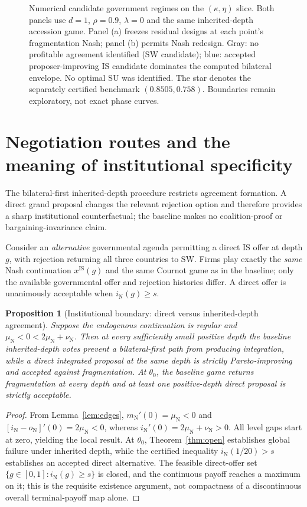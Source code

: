 \documentclass[11pt,a4paper]{article}
\newtheorem{proposition}[theorem]{Proposition}
\theoremstyle{remark}\newtheorem{remark}[theorem]{Remark}
\newcommand{\SW}{\mathrm{SW}}\newcommand{\SU}{\mathrm{SU}}\newcommand{\IS}{\mathrm{IS}}
\newcommand{\N}{\mathrm{N}}\newcommand{\F}{\mathrm{F}}
\begin{document}
\begin{figure}[H]
\centering
\resizebox{0.98\linewidth}{!}{}
\caption{Numerical candidate government regimes on the $(\kappa,\eta)$ slice. Both panels use $d=1$, $\rho=0.9$, $\lambda=0$ and the same inherited-depth accession game. Panel (a) freezes residual designs at each point's fragmentation Nash; panel (b) permits Nash redesign. Gray: no profitable agreement identified (SW candidate); blue: accepted proposer-improving IS candidate dominates the computed bilateral envelope. No optimal SU was identified. The star denotes the separately certified benchmark $(0.8505,0.758)$. Boundaries remain exploratory, not exact phase curves.}
\label{fig:phase}
\end{figure}

\section{Negotiation routes and the meaning of institutional specificity}\label{sec:institution}
The bilateral-first inherited-depth procedure restricts agreement formation. A direct grand proposal changes the relevant rejection option and therefore provides a sharp institutional counterfactual; the baseline makes no coalition-proof or bargaining-invariance claim.

Consider an \emph{alternative} governmental agenda permitting a direct $\IS$ offer at depth $g$, with rejection returning all three countries to $\SW$. Firms play exactly the \emph{same} Nash continuation $x^{\IS}(g)$ and the same Cournot game as in the baseline; only the available governmental offer and rejection histories differ. A direct offer is unanimously acceptable when $i_{\N}(g)\ge s$.

\begin{proposition}[Institutional boundary: direct versus inherited-depth agreement]\label{prop:direct}
Suppose the endogenous continuation is regular and $\mu_{\N}<0<2\mu_{\N}+\nu_{\N}$. Then at every sufficiently small positive depth the baseline inherited-depth votes prevent a bilateral-first path from producing integration, while a \emph{direct} integrated proposal at the same depth is strictly Pareto-improving and accepted against fragmentation. At $\theta_0$, the baseline game returns fragmentation at every depth and at least one positive-depth direct proposal is strictly acceptable.
\end{proposition}
\begin{proof}
From Lemma~\ref{lem:edges}, $m_{\N}'(0)=\mu_{\N}<0$ and $[i_{\N}-o_{\N}]'(0)=2\mu_{\N}<0$, whereas $i_{\N}'(0)=2\mu_{\N}+\nu_{\N}>0$. All level gaps start at zero, yielding the local result. At $\theta_0$, Theorem~\ref{thm:open} establishes global failure under inherited depth, while the certified inequality $i_{\N}(1/20)>s$ establishes an accepted direct alternative. The feasible direct-offer set $\{g\in[0,1]:i_{\N}(g)\ge s\}$ is closed, and the continuous payoff reaches a maximum on it; this is the requisite existence argument, not compactness of a discontinuous overall terminal-payoff map alone.
\end{proof}
\end{document}
